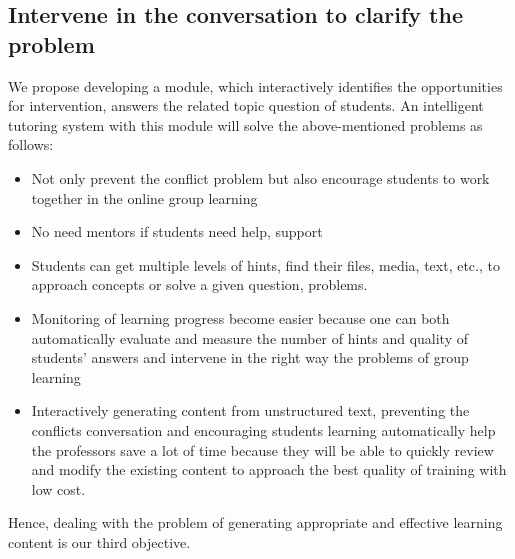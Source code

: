 \documentclass[letterpaper%
, twoside%
, 12pt%
,these%
, english%
,creativecommons,hyperref, withAlgo2e %
]{thETS}
\begin{document}
\subsection{Intervene in the conversation to clarify the problem}
We propose developing a module, which interactively identifies the opportunities for intervention, answers the related topic question of students. An intelligent tutoring system with this module will solve the above-mentioned problems as follows:
\begin{itemize}
	\item Not only prevent the conflict problem but also encourage students to work together in the online group learning
	\item No need mentors if students need help, support
	\item Students can get multiple levels of hints, find their files, media, text, etc., to approach concepts or solve a given question, problems.
	\item     Monitoring of learning progress become easier because one can both automatically evaluate and measure the number of hints and quality of students’ answers and intervene in the right way the problems of group learning 
	\item     Interactively generating content from unstructured text, preventing the conflicts conversation and encouraging students learning automatically help the professors save a lot of time because they will be able to quickly review and modify the existing content to approach the best quality of training with low cost.
\end{itemize}


Hence, dealing with the problem of generating appropriate and effective learning content is our third objective.
\end{document}
